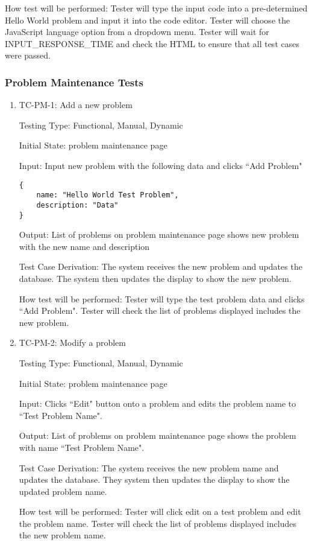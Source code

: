 \documentclass[12pt, titlepage]{article}
\begin{document}
How test will be performed: Tester will type the input code into a pre-determined Hello World problem and input it into the code editor. Tester will choose the JavaScript language option from a dropdown menu. Tester will wait for INPUT\_RESPONSE\_TIME and check the HTML to ensure that all test cases were passed.

\subsubsection{Problem Maintenance Tests}
\begin{enumerate}
\item{TC-PM-1: Add a new problem}

Testing Type: Functional, Manual, Dynamic
					
Initial State: problem maintenance page
					
Input: Input new problem with the following data and clicks ``Add Problem" 
\begin{verbatim}
{
    name: "Hello World Test Problem",
    description: "Data"
}
\end{verbatim}
					
Output: List of problems on problem maintenance page shows new problem with the new name and description

Test Case Derivation: The system receives the new problem and updates the database. The system then updates the display to show the new problem.
					
How test will be performed: Tester will type the test problem data and clicks ``Add Problem". Tester will check the list of problems displayed includes the new problem.

\item{TC-PM-2: Modify a problem}

Testing Type: Functional, Manual, Dynamic
					
Initial State: problem maintenance page
					
Input: Clicks ``Edit" button onto a problem and edits the problem name to ``Test Problem Name".
					
Output: List of problems on problem maintenance page shows the problem with name ``Test Problem Name".

Test Case Derivation: The system receives the new problem name and updates the database. They system then updates the display to show the updated problem name.
					
How test will be performed: Tester will click edit on a test problem and edit the problem name. Tester will check the list of problems displayed includes the new problem name.


\end{enumerate}
\end{document}
